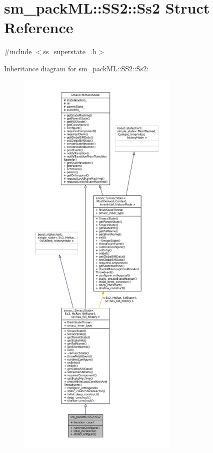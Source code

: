 \hypertarget{structsm__packML_1_1SS2_1_1Ss2}{}\section{sm\+\_\+pack\+ML\+:\+:S\+S2\+:\+:Ss2 Struct Reference}
\label{structsm__packML_1_1SS2_1_1Ss2}


{\ttfamily \#include $<$ss\+\_\+superstate\+\_.\+h$>$}



Inheritance diagram for sm\+\_\+pack\+ML\+:\+:S\+S2\+:\+:Ss2\+:
\nopagebreak
\begin{figure}[H]
\begin{center}
\leavevmode
\includegraphics[height=550pt]{structsm__packML_1_1SS2_1_1Ss2__inherit__graph}
\end{center}
\end{figure}


